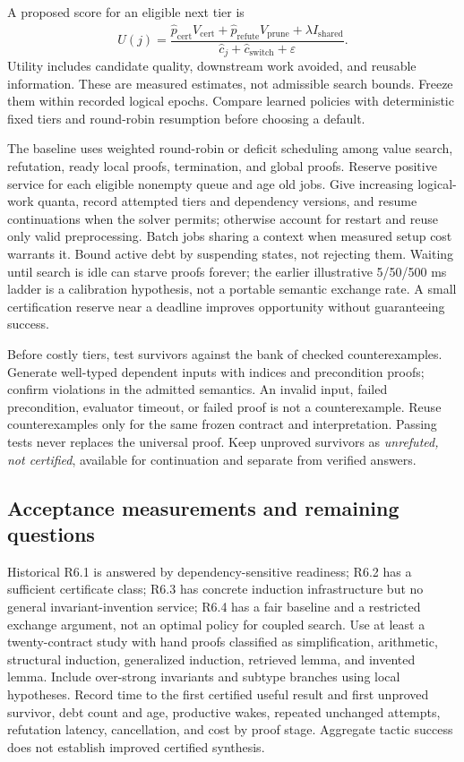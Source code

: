 A proposed score for an eligible next tier is
\[
 U(j)=\frac{\widehat p_{\mathrm{cert}}V_{\mathrm{cert}}
              +\widehat p_{\mathrm{refute}}V_{\mathrm{prune}}
              +\lambda\widehat I_{\mathrm{shared}}}
             {\widehat c_j+\widehat c_{\mathrm{switch}}+\varepsilon}.
\]
Utility includes candidate quality, downstream work avoided, and reusable information. These are measured estimates, not admissible search bounds. Freeze them within recorded logical epochs. Compare learned policies with deterministic fixed tiers and round-robin resumption before choosing a default.

The baseline uses weighted round-robin or deficit scheduling among value search, refutation, ready local proofs, termination, and global proofs. Reserve positive service for each eligible nonempty queue and age old jobs. Give increasing logical-work quanta, record attempted tiers and dependency versions, and resume continuations when the solver permits; otherwise account for restart and reuse only valid preprocessing. Batch jobs sharing a context when measured setup cost warrants it. Bound active debt by suspending states, not rejecting them. Waiting until search is idle can starve proofs forever; the earlier illustrative 5/50/500 ms ladder is a calibration hypothesis, not a portable semantic exchange rate. A small certification reserve near a deadline improves opportunity without guaranteeing success.

Before costly tiers, test survivors against the bank of checked counterexamples. Generate well-typed dependent inputs with indices and precondition proofs; confirm violations in the admitted semantics. An invalid input, failed precondition, evaluator timeout, or failed proof is not a counterexample. Reuse counterexamples only for the same frozen contract and interpretation. Passing tests never replaces the universal proof. Keep unproved survivors as \emph{unrefuted, not certified}, available for continuation and separate from verified answers.

\subsection{Acceptance measurements and remaining questions}\label{sec:contract-open}

Historical R6.1 is answered by dependency-sensitive readiness; R6.2 has a sufficient certificate class; R6.3 has concrete induction infrastructure but no general invariant-invention service; R6.4 has a fair baseline and a restricted exchange argument, not an optimal policy for coupled search. Use at least a twenty-contract study with hand proofs classified as simplification, arithmetic, structural induction, generalized induction, retrieved lemma, and invented lemma. Include over-strong invariants and subtype branches using local hypotheses. Record time to the first certified useful result and first unproved survivor, debt count and age, productive wakes, repeated unchanged attempts, refutation latency, cancellation, and cost by proof stage. Aggregate tactic success does not establish improved certified synthesis.


